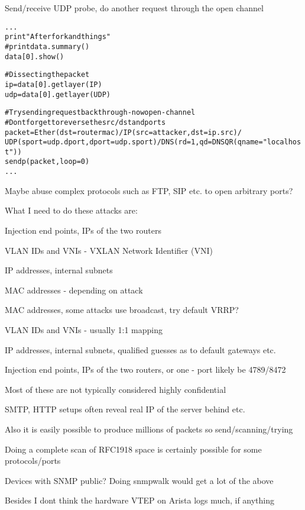 \documentclass[Screen16to9,17pt,footrule]{foils}
\begin{document}

Send/receive UDP probe, do another request through the open channel
\begin{alltt}\footnotesize
...
print "After fork and things"
#print data.summary()
data[0].show()

# Dissecting the packet
ip=data[0].getlayer(IP)
udp=data[0].getlayer(UDP)

# Try sending request back through - now open - channel
# Dont forget to reverse the src/dst and ports
packet=Ether(dst=routermac)/IP(src=attacker,dst=ip.src)/
    UDP(sport=udp.dport,dport=udp.sport)/DNS(rd=1,qd=DNSQR(qname="localhost"))
sendp(packet,loop=0)
...
\end{alltt}

Maybe abuse complex protocols such as FTP, SIP etc. to open arbitrary ports?


What I need to do these attacks are:
\begin{list2}
\item Injection end points, IPs of the two routers
\item VLAN IDs and VNIs - VXLAN Network Identifier (VNI)
\item IP addresses, internal subnets
\item MAC addresses - depending on attack
\end{list2}


\begin{list2}
\item MAC addresses, some attacks use broadcast, try default VRRP?
\item VLAN IDs and VNIs - usually 1:1 mapping
\item IP addresses, internal subnets, qualified guesses as to default gateways etc.
\item Injection end points, IPs of the two routers, or one -
port likely be 4789/8472
\item Most of these are not typically considered highly confidential
\item SMTP, HTTP setups often reveal real IP of the server behind etc.
\item Also it is easily possible to produce millions of packets so send/scanning/trying
\item Doing a complete scan of RFC1918 space is certainly possible for some protocols/ports
\item Devices with SNMP public? Doing snmpwalk would get a lot of the above
\item Besides I dont think the hardware VTEP on Arista logs much, if anything
\end{list2}
\end{document}
